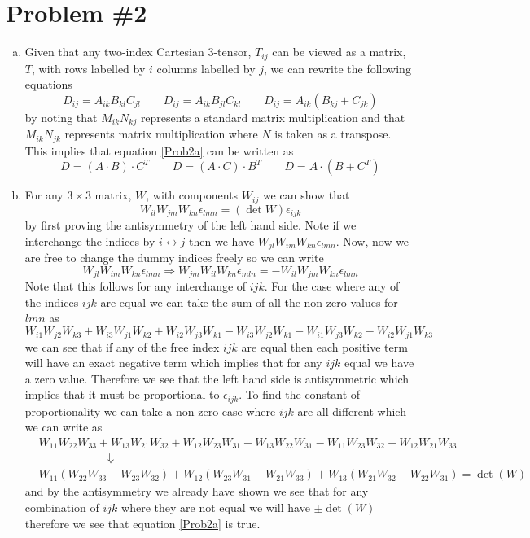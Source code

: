 \documentclass[11pt]{article}
\numberwithin{equation}{section}
\begin{document}
\section{Problem \#2}
\begin{enumerate}[(a)]
\item
    Given that any two-index Cartesian 3-tensor, $T_{ij}$ can be viewed as a matrix, $T$, with rows labelled by $i$ 
    columns labelled by $j$, we can rewrite the following equations
    \begin{equation}
        D_{ij} = A_{ik}B_{kl}C_{jl}\qquad D_{ij} = A_{ik}B_{jl}C_{kl}\qquad D_{ij} = A_{ik}(B_{kj}+C_{jk})
        \label{Prob2a}
    \end{equation}
    by noting that $M_{ik}N_{kj}$ represents a standard matrix multiplication and that $M_{ik}N_{jk}$ represents
    matrix multiplication where $N$ is taken as a transpose. This implies that equation \ref{Prob2a} can be written 
    as
    $$D = (A\cdot{B})\cdot{C^T}\qquad D  = (A\cdot{C})\cdot{B^T}\qquad D =   A\cdot({B}+{C^T})$$

\item
    For any $3\times3$ matrix, $W$, with components $W_{ij}$ we can show that 
    \begin{equation}
        W_{il}W_{jm}W_{kn}\epsilon_{lmn} = (\det{W})\epsilon_{ijk}
        \label{Prob2a}
    \end{equation}
    by first proving the antisymmetry of the left hand side. Note if we interchange the indices by
    $i\leftrightarrow{j}$ then we have $W_{jl}W_{im}W_{kn}\epsilon_{lmn}$. Now, now we are free to change the dummy
    indices freely so we can write
    $$W_{jl}W_{im}W_{kn}\epsilon_{lmn} \Rightarrow W_{jm}W_{il}W_{kn}\epsilon_{mln} = -W_{il}W_{jm}W_{kn}\epsilon_{lmn}$$
    Note that this follows for any interchange of $ijk$. For the case where any of the indices $ijk$ are equal we can
    take the sum of all the non-zero values for $lmn$ as
    $$ W_{i1}W_{j2}W_{k3} + W_{i3}W_{j1}W_{k2} + W_{i2}W_{j3}W_{k1} - W_{i3}W_{j2}W_{k1} - W_{i1}W_{j3}W_{k2} - W_{i2}W_{j1}W_{k3}$$
    we can see that if any of the free index $ijk$ are equal then each positive term will have an exact negative term
    which implies that for any $ijk$ equal we have a zero value. Therefore we see that the left hand side is 
    antisymmetric which implies that it must be proportional to $\epsilon_{ijk}$. To find the constant of 
    proportionality we can take a non-zero case where $ijk$ are all different which we can write as
    \begin{align*}
        &W_{11}W_{22}W_{33} + W_{13}W_{21}W_{32} + W_{12}W_{23}W_{31} - W_{13}W_{22}W_{31} - W_{11}W_{23}W_{32} - W_{12}W_{21}W_{33}\\
        &\qquad\qquad\qquad\Downarrow\\
        &W_{11}(W_{22}W_{33}-W_{23}W_{32}) + W_{12}(W_{23}W_{31}-W_{21}W_{33}) + W_{13}(W_{21}W_{32}-W_{22}W_{31}) = \det(W)
    \end{align*}
    and by the antisymmetry we already have shown we see that for any combination of $ijk$ where they are not equal 
    we will have $\pm\det(W)$ therefore we see that equation \ref{Prob2a} is true.


\end{enumerate}
\end{document}
